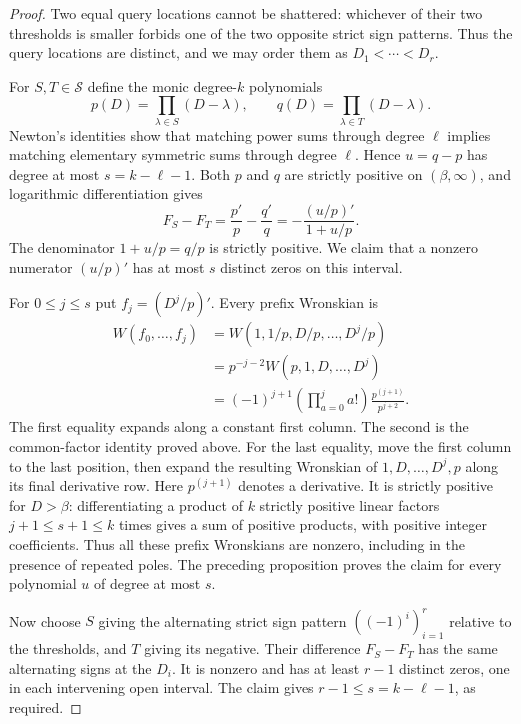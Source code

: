 \documentclass[11pt]{article}
\begin{document}
\begin{proof}
Two equal query locations cannot be shattered: whichever of their two
thresholds is smaller forbids one of the two opposite strict sign
patterns. Thus the query locations are distinct, and we may order them
as $D_1<\cdots<D_r$.

For $S,T\in\mathcal S$ define the monic degree-$k$ polynomials
\[
 p(D)=\prod_{\lambda\in S}(D-\lambda),\qquad
 q(D)=\prod_{\lambda\in T}(D-\lambda).
\]
Newton's identities show that matching power sums through degree
$\ell$ implies matching elementary symmetric sums through degree
$\ell$. Hence $u=q-p$ has degree at most
$s=k-\ell-1$. Both $p$ and $q$ are strictly positive on
$(\beta,\infty)$, and logarithmic differentiation gives
\[
 F_S-F_T=\frac{p'}p-\frac{q'}q
 =-\frac{(u/p)'}{1+u/p}.
\]
The denominator $1+u/p=q/p$ is strictly positive. We claim that a
nonzero numerator $(u/p)'$ has at most $s$ distinct zeros on this
interval.

For $0\leq j\leq s$ put $f_j=(D^j/p)'$. Every prefix Wronskian is
\[
 \begin{aligned}
 W(f_0,\ldots,f_j)
 &=W(1,1/p,D/p,\ldots,D^j/p)\\
 &=p^{-j-2}W(p,1,D,\ldots,D^j)\\
 &=(-1)^{j+1}\left(\prod_{a=0}^j a!\right)
       \frac{p^{(j+1)}}{p^{j+2}}.
 \end{aligned}
\]
The first equality expands along a constant first column. The second
is the common-factor identity proved above. For the last equality,
move the first column to the last position, then expand the resulting
Wronskian of $1,D,\ldots,D^j,p$ along its final derivative row.
Here $p^{(j+1)}$ denotes a derivative. It is strictly positive for
$D>\beta$: differentiating a product of $k$ strictly positive linear
factors $j+1\leq s+1\leq k$ times gives a sum of positive products,
with positive integer coefficients. Thus all these prefix Wronskians
are nonzero, including in the presence of repeated poles. The
preceding proposition proves the claim for every polynomial $u$ of
degree at most $s$.

Now choose $S$ giving the alternating strict sign pattern
$((-1)^i)_{i=1}^r$ relative to the thresholds, and $T$ giving its
negative. Their difference $F_S-F_T$ has the same alternating signs
at the $D_i$. It is nonzero and has at least $r-1$ distinct zeros,
one in each intervening open interval. The claim gives
$r-1\leq s=k-\ell-1$, as required.
\end{proof}
\end{document}
